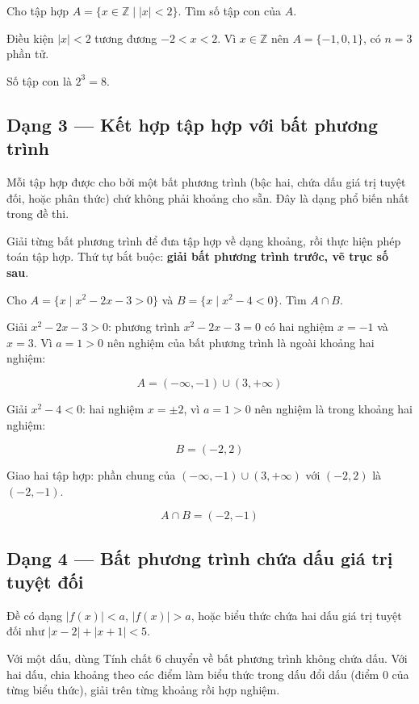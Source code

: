 \documentclass[11pt, a4paper]{article}
\begin{document}
\begin{vidu}[{2}]
Cho tập hợp $A = \{x \in \mathbb{Z} \mid |x| < 2\}$. Tìm số tập con của $A$.

Điều kiện $|x| < 2$ tương đương $-2 < x < 2$. Vì $x \in \mathbb{Z}$ nên $A = \{-1, 0, 1\}$, có $n = 3$ phần tử.

Số tập con là $2^3 = 8$.

\end{vidu}
\subsection{Dạng 3 — Kết hợp tập hợp với bất phương trình}

 Mỗi tập hợp được cho bởi một bất phương trình (bậc hai, chứa dấu giá trị tuyệt đối, hoặc phân thức) chứ không phải khoảng cho sẵn. Đây là dạng phổ biến nhất trong đề thi.

 Giải từng bất phương trình để đưa tập hợp về dạng khoảng, rồi thực hiện phép toán tập hợp. Thứ tự bắt buộc: \textbf{giải bất phương trình trước, vẽ trục số sau}.

\begin{vidu}[{3}]
Cho $A = \{x \mid x^2 - 2x - 3 > 0\}$ và $B = \{x \mid x^2 - 4 < 0\}$. Tìm $A \cap B$.

Giải $x^2 - 2x - 3 > 0$: phương trình $x^2 - 2x - 3 = 0$ có hai nghiệm $x = -1$ và $x = 3$. Vì $a = 1 > 0$ nên nghiệm của bất phương trình là ngoài khoảng hai nghiệm:

$$A = (-\infty, -1) \cup (3, +\infty)$$

Giải $x^2 - 4 < 0$: hai nghiệm $x = \pm 2$, vì $a = 1 > 0$ nên nghiệm là trong khoảng hai nghiệm:

$$B = (-2, 2)$$

Giao hai tập hợp: phần chung của $(-\infty, -1) \cup (3, +\infty)$ với $(-2, 2)$ là $(-2, -1)$.

$$A \cap B = (-2, -1)$$

\end{vidu}
\subsection{Dạng 4 — Bất phương trình chứa dấu giá trị tuyệt đối}

 Đề có dạng $|f(x)| < a$, $|f(x)| > a$, hoặc biểu thức chứa hai dấu giá trị tuyệt đối như $|x - 2| + |x + 1| < 5$.

 Với một dấu, dùng Tính chất 6 chuyển về bất phương trình không chứa dấu. Với hai dấu, chia khoảng theo các điểm làm biểu thức trong dấu đổi dấu (điểm 0 của từng biểu thức), giải trên từng khoảng rồi hợp nghiệm.
\end{document}
